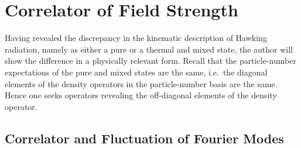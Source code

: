 \chapter{Correlator of Field Strength}
\label{chap:corr_field}

Having revealed the discrepancy in the kinematic description of Hawking 
radiation, namely as either a pure or a thermal and mixed state, the author 
will show the difference in a physically relevant form. Recall that the 
particle-number expectations of the pure and mixed states are the same, 
i.e.\ the diagonal elements of the density operators in the particle-number 
basis are the same. Hence one seeks operators revealing the off-diagonal 
elements of the density operator.

\section{Correlator and Fluctuation of Fourier Modes}
\label{sec:corr_Fourier}

